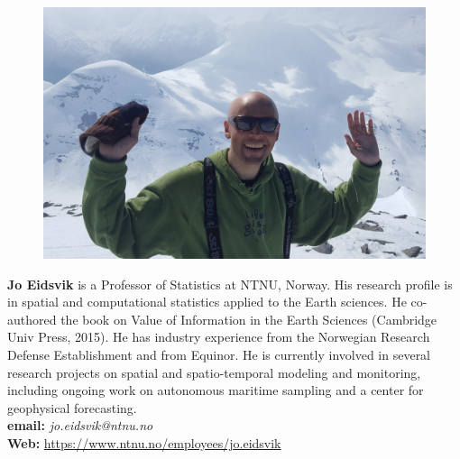 \parbox{6.5in}{
\begin{figure} %
    \vspace{-\intextsep}
    \hspace*{-.35\columnsep}\includegraphics[scale=0.055]{fig/Eidsvikpicture.jpg}
\end{figure}
\textbf{Jo Eidsvik} is a Professor of Statistics at NTNU, Norway. His
research profile is in spatial and computational statistics applied to
the Earth sciences. He co-authored the book on Value of Information in
the Earth Sciences (Cambridge Univ Press, 2015). He has industry
experience from the Norwegian Research Defense Establishment and from
Equinor. He is currently involved in several research projects on
spatial and spatio-temporal modeling and monitoring, including ongoing
work on autonomous maritime sampling and a center for geophysical
forecasting.\\


\textbf{email: }\emph{jo.eidsvik@ntnu.no}\\
\textbf{Web: }\url{https://www.ntnu.no/employees/jo.eidsvik} }

\vspace{20mm}


